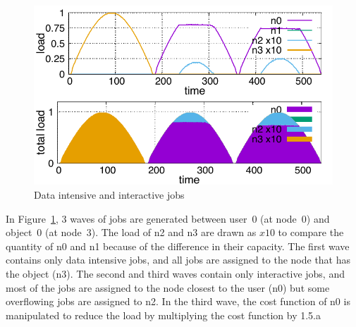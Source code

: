 \begin{figure}[tb]
  \begin{center}
    \includegraphics[width=1.0\columnwidth]{lowering.pdf}
    \vspace{-2.0ex}
    \caption{Data intensive and interactive jobs}
    \label{fig:lowering}
  \end{center}
\end{figure}

In Figure~\ref{fig:lowering}, 3 waves of jobs are generated between
user~0 (at node~0) and object~0 (at node~3).
The load of n2 and n3 are drawn as $x10$ to compare the quantity of n0
and n1 because of the difference in their capacity.
The first wave contains only data intensive jobs, and all jobs are
assigned to the node that has the object (n3).
The second and third waves contain only interactive jobs, and most of
the jobs are assigned to the node closest to the user (n0) but some
overflowing jobs are assigned to n2.
In the third wave, the cost function of n0 is manipulated to reduce
the load by multiplying the cost function by 1.5.a
